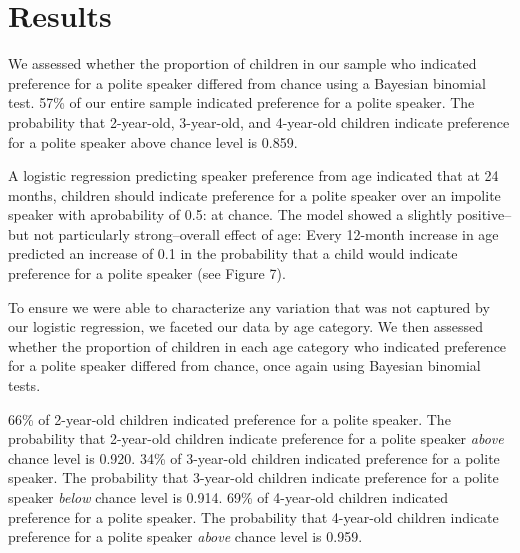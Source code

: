 \documentclass[
  english,
  man,floatsintext]{apa6}
\begin{document}
\hypertarget{results}{%
\section{Results}\label{results}}

We assessed whether the proportion of children in our sample who indicated preference for a polite speaker differed from chance using a Bayesian binomial test. 57\% of our entire sample indicated preference for a polite speaker. The probability that 2-year-old, 3-year-old, and 4-year-old children indicate preference for a polite speaker above chance level is 0.859.

A logistic regression predicting speaker preference from age indicated that at 24 months, children should indicate preference for a polite speaker over an impolite speaker with aprobability of 0.5: at chance. The model showed a slightly positive--but not particularly strong--overall effect of age: Every 12-month increase in age predicted an increase of 0.1 in the probability that a child would indicate preference for a polite speaker (see Figure 7).

To ensure we were able to characterize any variation that was not captured by our logistic regression, we faceted our data by age category. We then assessed whether the proportion of children in each age category who indicated preference for a polite speaker differed from chance, once again using Bayesian binomial tests.

66\% of 2-year-old children indicated preference for a polite speaker. The probability that 2-year-old children indicate preference for a polite speaker \emph{above} chance level is 0.920. 34\% of 3-year-old children indicated preference for a polite speaker. The probability that 3-year-old children indicate preference for a polite speaker \emph{below} chance level is 0.914. 69\% of 4-year-old children indicated preference for a polite speaker. The probability that 4-year-old children indicate preference for a polite speaker \emph{above} chance level is 0.959.
\end{document}
